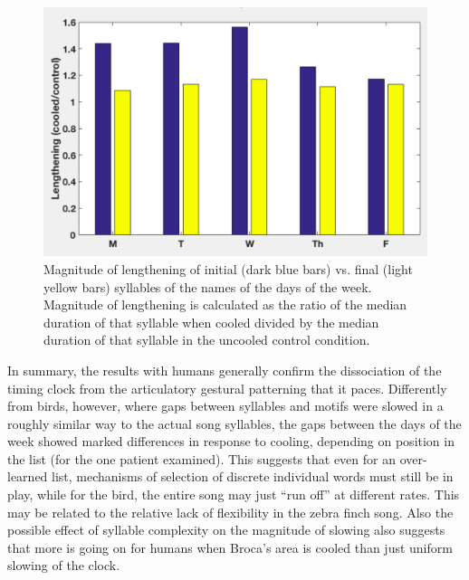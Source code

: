 \documentclass[output=paper,
modfonts
]{LSP/langsci}
\begin{document}
\begin{figure}
\includegraphics [width=5in]{lengthening}
\caption{Magnitude of lengthening of initial (dark blue bars) vs. final (light yellow bars) syllables of the names of the days of the week. Magnitude of lengthening is calculated as the ratio of the median duration of that syllable when cooled divided by the median duration of that syllable in the uncooled control condition.}
\end{figure}

In summary, the results with humans generally confirm the dissociation of the timing clock from the articulatory gestural patterning that it paces.  Differently from birds, however, where gaps between syllables and motifs were slowed in a roughly similar way to the actual song syllables, the gaps between the days of the week showed marked differences in response to cooling, depending on position in the list (for the one patient examined). This suggests that even for an over-learned list, mechanisms of selection of discrete individual words must still be in play, while for the bird, the entire song may just ``run off'' at different rates. This may be related to the relative lack of flexibility in the zebra finch song. Also the possible effect of syllable complexity on the magnitude of slowing also suggests that more is going on for humans when Broca's area is cooled than just uniform slowing of the clock.
 
\end{document}

